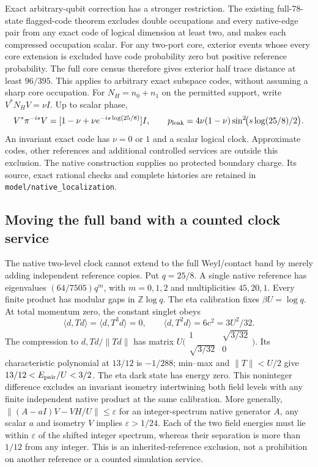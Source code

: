 Exact arbitrary-qubit correction has a stronger restriction. The existing
full-78-state flagged-code theorem excludes double occupations and every
native-edge pair from any exact code of logical dimension at least two,
and makes each compressed occupation scalar. For any two-port core,
exterior events whose every core extension is excluded have code
probability zero but positive reference probability. The full core census
therefore gives exterior half trace distance at least $96/395$.
This applies to arbitrary exact subspace codes, without assuming a sharp
core occupation. For $N_H=n_0+n_1$ on the permitted support, write
$V^*N_HV=\nu I$. Up to scalar phase,
\[
 V^*\pi^{-is}V=[1-\nu+\nu e^{-is\log(25/8)}]I,
 \qquad
 p_{\rm leak}=4\nu(1-\nu)\sin^2\!\bigl(s\log(25/8)/2\bigr).
\]
An invariant exact code has $\nu=0$ or $1$ and a scalar logical clock.
Approximate codes, other references and additional controlled services are
outside this exclusion. The native construction supplies no protected
boundary charge. Its source, exact rational checks and complete histories
are retained in \texttt{model/native\_localization}.

\subsection{Moving the full band with a counted clock service}
\label{subsec:full-band-counted-clock}

The native two-level clock cannot extend to the full Weyl/contact band by
merely adding independent reference copies. Put $q=25/8$. A single native
reference has eigenvalues $(64/7505)q^m$, with $m=0,1,2$ and multiplicities
$45,20,1$. Every finite product has modular gaps in $\mathbb Z\log q$.
The eta calibration fixes $\beta U=\log q$. At total momentum zero, the
constant singlet obeys
\[
 \langle d,Td\rangle=\langle d,T^3d\rangle=0,
 \qquad \langle d,T^2d\rangle=6c^2=3U^2/32.
\]
The compression to $d,Td/\|Td\|$ has matrix
$U\bigl(\begin{smallmatrix}1&\sqrt{3/32}\\\sqrt{3/32}&0\end{smallmatrix}\bigr)$.
Its characteristic polynomial at $13/12$ is $-1/288$; min--max and
$\|T\|<U/2$ give $13/12<E_{\rm pair}/U<3/2$.
The eta dark state has energy zero. This noninteger difference excludes
an invariant isometry intertwining both field levels with any finite
independent native product at the same calibration. More generally,
$\|(A-aI)V-VH/U\|\le\varepsilon$ for an integer-spectrum native generator
$A$, any scalar $a$ and isometry $V$ implies $\varepsilon>1/24$.
Each of the two field energies must lie within $\varepsilon$ of the shifted
integer spectrum, whereas their separation is more than $1/12$ from any
integer. This is an inherited-reference exclusion, not a prohibition on
another reference or a counted simulation service.

